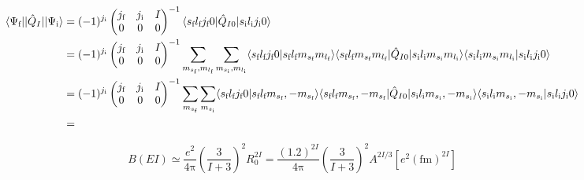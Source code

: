 \begin{booknote*}
\begin{align*}
\langle\Psi_{\text{f}}||\hat{Q}_{I}||\Psi_{\text{i}}\rangle & =(-1)^{j_{\text{\text{i}}}}\begin{pmatrix}j_{\text{f}} & j_{\text{i}} & I\\
0 & 0 & 0
\end{pmatrix}^{-1}\langle s_{\text{f}}l_{\text{f}}j_{\text{f}}0|\hat{Q}_{I0}|s_{\text{i}}l_{\text{i}}j_{\text{i}}0\rangle\\
 & =(-1)^{j_{\text{\text{i}}}}\begin{pmatrix}j_{\text{f}} & j_{\text{i}} & I\\
0 & 0 & 0
\end{pmatrix}^{-1}\sum_{m_{s_{\text{f}}},m_{l_{\text{f}}}}\sum_{m_{s_{\text{i}}},m_{l_{\text{i}}}}\langle s_{\text{f}}l_{\text{f}}j_{\text{f}}0|s_{\text{f}}l_{\text{f}}m_{s_{\text{f}}}m_{l_{\text{f}}}\rangle\langle s_{\text{f}}l_{\text{f}}m_{s_{\text{f}}}m_{l_{\text{f}}}|\hat{Q}_{I0}|s_{\text{i}}l_{\text{i}}m_{s_{\text{i}}}m_{l_{\text{i}}}\rangle\langle s_{\text{i}}l_{\text{i}}m_{s_{\text{i}}}m_{l_{\text{i}}}|s_{\text{i}}l_{\text{i}}j_{\text{i}}0\rangle\\
 & =(-1)^{j_{\text{\text{i}}}}\begin{pmatrix}j_{\text{f}} & j_{\text{i}} & I\\
0 & 0 & 0
\end{pmatrix}^{-1}\sum_{m_{s_{\text{f}}}}\sum_{m_{s_{\text{i}}}}\langle s_{\text{f}}l_{\text{f}}j_{\text{f}}0|s_{\text{f}}l_{\text{f}}m_{s_{\text{f}}},-m_{s_{\text{f}}}\rangle\langle s_{\text{f}}l_{\text{f}}m_{s_{\text{f}}},-m_{s_{\text{f}}}|\hat{Q}_{I0}|s_{\text{i}}l_{\text{i}}m_{s_{\text{i}}},-m_{s_{\text{i}}}\rangle\langle s_{\text{i}}l_{\text{i}}m_{s_{\text{i}}},-m_{s_{\text{i}}}|s_{\text{i}}l_{\text{i}}j_{\text{i}}0\rangle\\
 & =
\end{align*}
\end{booknote*}
\begin{equation}
B(EI)\simeq\frac{e^{2}}{4\mathrm{\pi}}\left(\frac{3}{I+3}\right)^{2}R^{2I}_{0}=\frac{(1.2)^{2I}}{4\mathrm{\pi}}\left(\frac{3}{I+3}\right)^{2}A^{2I/3}[e^{2}(\text{fm})^{2I}]\label{eq:Weisskopf=005355=004F4D}
\end{equation}

